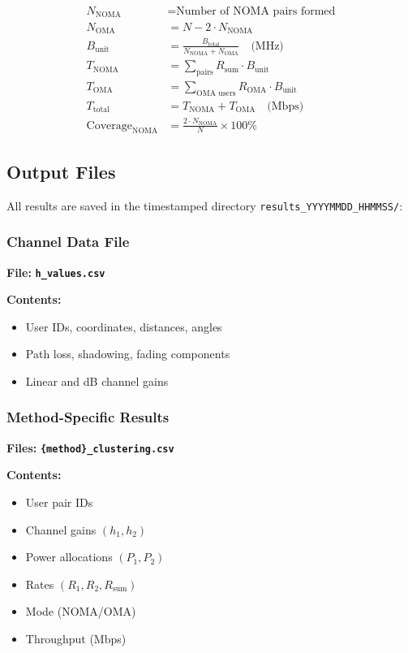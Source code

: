 \documentclass[12pt,a4paper]{article}
\newcommand{\code}[1]{\texttt{#1}}
\newcommand{\file}[1]{\texttt{\textbf{#1}}}
\begin{document}
\begin{align}
N_{\text{NOMA}} &= \text{Number of NOMA pairs formed} \\
N_{\text{OMA}} &= N - 2 \cdot N_{\text{NOMA}} \\
B_{\text{unit}} &= \frac{B_{\text{total}}}{N_{\text{NOMA}} + N_{\text{OMA}}} \quad \text{(MHz)} \\
T_{\text{NOMA}} &= \sum_{\text{pairs}} R_{\text{sum}} \cdot B_{\text{unit}} \\
T_{\text{OMA}} &= \sum_{\text{OMA users}} R_{\text{OMA}} \cdot B_{\text{unit}} \\
T_{\text{total}} &= T_{\text{NOMA}} + T_{\text{OMA}} \quad \text{(Mbps)} \\
\text{Coverage}_{\text{NOMA}} &= \frac{2 \cdot N_{\text{NOMA}}}{N} \times 100\%
\end{align}

\subsection{Output Files}

All results are saved in the timestamped directory \code{results\_YYYYMMDD\_HHMMSS/}:

\subsubsection{Channel Data File}

\textbf{File:} \file{h\_values.csv}

\textbf{Contents:}
\begin{itemize}
    \item User IDs, coordinates, distances, angles
    \item Path loss, shadowing, fading components
    \item Linear and dB channel gains
\end{itemize}

\subsubsection{Method-Specific Results}

\textbf{Files:} \file{\{method\}\_clustering.csv}

\textbf{Contents:}
\begin{itemize}
    \item User pair IDs
    \item Channel gains $(h_1, h_2)$
    \item Power allocations $(P_1, P_2)$
    \item Rates $(R_1, R_2, R_{\text{sum}})$
    \item Mode (NOMA/OMA)
    \item Throughput (Mbps)
\end{itemize}
\end{document}
